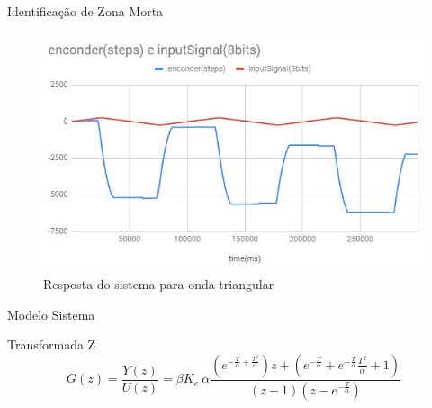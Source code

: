 \documentclass{beamer}
\begin{document}
\begin{frame}{Identificação de Zona Morta}
\begin{figure}
    \centering
    \includegraphics[width = \linewidth]{src/tex/img/grafico_dente_serra.jpg}
    \caption{Resposta do sistema para onda triangular}
    \label{fig:control_1}
\end{figure}
\end{frame}

\begin{frame}{Modelo Sistema}
    \begin{block}{Transformada Z}
        \begin{equation}
        G(z) = \frac{Y(z)}{U(z)} = \beta K_e \ \alpha \frac{\left(e^{-\frac{T}{\alpha} + \frac{T^2}{\alpha}}\right)z + \left(e^{-\frac{T}{\alpha}}+e^{-\frac{T}{\alpha}}\frac{T^2}{\alpha}+1\right)  }{\left(z-1\right)\left(z-e^{-\frac{T}{\alpha}}\right)}
        \label{transfdisc}
        \end{equation}
    \end{block}
\end{frame}
\end{document}
